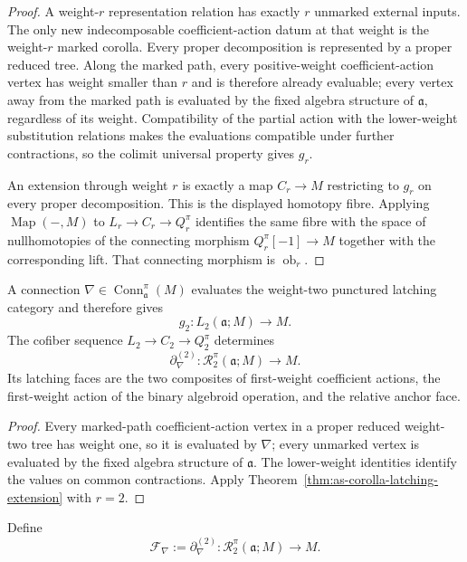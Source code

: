 \begin{proof}
A weight-$r$ representation relation has exactly $r$ unmarked external inputs.
The only new indecomposable coefficient-action datum at that weight is the
weight-$r$ marked corolla.  Every proper decomposition is represented by a
proper reduced tree.  Along the marked path, every positive-weight
coefficient-action vertex has weight smaller than $r$ and is therefore
already evaluable; every vertex away from the marked path is evaluated by the
fixed algebra structure of $\mathfrak a$, regardless of its weight.
Compatibility of the partial action with the lower-weight substitution
relations makes the evaluations compatible under further contractions, so
the colimit universal property gives $g_r$.

An extension through weight $r$ is exactly a map $C_r\to M$ restricting to
$g_r$ on every proper decomposition.  This is the displayed homotopy fibre.
Applying $\operatorname{Map}(-,M)$ to
$L_r\to C_r\to Q_r^\pi$ identifies the same fibre with the space of
nullhomotopies of the connecting morphism $Q_r^\pi[-1]\to M$ together with
the corresponding lift.  That connecting morphism is
$\operatorname{ob}_r$.
\end{proof}

\begin{proposition}
\label{prop:as-connection-binary-relation}
A connection
$\nabla\in\operatorname{Conn}_{\mathfrak a}^{\pi}(M)$ evaluates the
weight-two punctured latching category and therefore gives
\[
    g_2:L_2(\mathfrak a;M)\longrightarrow M.
\]
The cofiber sequence
$L_2\to C_2\to Q_2^\pi$ determines
\[
\boxed{
    \partial_\nabla^{(2)}:
    \mathcal R_2^\pi(\mathfrak a;M)
    \longrightarrow M.
}
\]
Its latching faces are the two composites of first-weight coefficient actions,
the first-weight action of the binary algebroid operation, and the relative
anchor face.
\end{proposition}

\begin{proof}
Every marked-path coefficient-action vertex in a proper reduced weight-two
tree has weight one, so it is evaluated by $\nabla$; every unmarked vertex is
evaluated by the fixed algebra structure of $\mathfrak a$.  The lower-weight
identities identify the values on common contractions.  Apply
Theorem~\ref{thm:as-corolla-latching-extension} with $r=2$.
\end{proof}

\begin{definition}
\label{def:as-complete-curvature}
Define
\[
\boxed{
    \mathcal F_\nabla
    :=
    \partial_\nabla^{(2)}:
    \mathcal R_2^\pi(\mathfrak a;M)
    \longrightarrow M.
}
\]
\end{definition}

